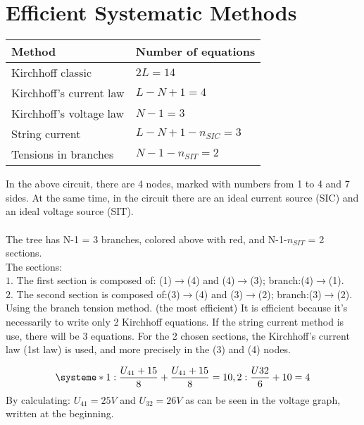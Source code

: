 \documentclass[12pt,twoside]{article}
\begin{document}
\section{Efficient Systematic Methods}
\begin{center}
\begin{tabular}{|m{10cm}|m{5cm}|}
\hline
Method & Number of equations\\
\hline\hline
Kirchhoff classic & $2L = 14$\\
\hline
Kirchhoff's current law & $L - N + 1 = 4$\\
\hline
Kirchhoff's voltage law & $N - 1 = 3$\\
\hline
String current & $L - N + 1 - n_{SIC} = 3$\\
\hline
Tensions in branches & $N - 1 - n_{SIT} = 2$\\
\hline
\end{tabular}
\end{center}
In the above circuit, there are 4 nodes, marked with numbers 
from 1 to 4 and 7 sides. At the same time, in the circuit 
there are an ideal current source (SIC) and an ideal voltage source (SIT).\\\\
The tree has N-1 = 3 branches, colored above with red, and N-1-$n_{SIT}$ = 2 sections.\\
The sections:\\
\(1.\) The first section is composed of: (1)$\rightarrow$(4) and (4)$\rightarrow$(3); branch:(4)$\rightarrow$(1).\\
\(2.\) The second section is composed of:(3)$\rightarrow$(4) and (3)$\rightarrow$(2); branch:(3)$\rightarrow$(2).
\newpage
Using the branch tension method. 
(the most efficient) It is efficient because 
it's necessarily to write only 2 Kirchhoff 
equations. 
If the string current method is use, there will be 3 equations. 
For the 2 chosen sections, the Kirchhoff's current law (1st law) is used, and more precisely in the (3) and (4) nodes.

\begin{equation}
\systeme*{
{1}:\frac{U_{41}+15}{8}+\frac{U_{41}+15}{8}=10,
{2}:\frac{U{32}}{6}+10=4}
\end{equation}
By calculating: $U_{41}=25V$ and $U_{32}=26V$ as can be seen in the voltage graph, written at the beginning.
\newpage
\end{document}
